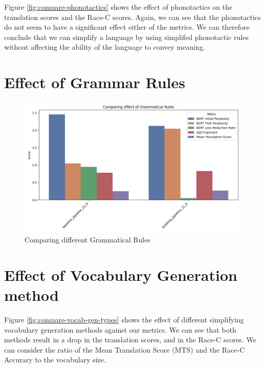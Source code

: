 Figure \ref{fig:compare-phonotactics} shows the effect of phonotactics on the translation scores and the Race-C scores. Again, we can see that
the phonotactics do not seem to have a significant effect either of the metrics. We can therefore conclude that we can simplify a language by 
using simplifed phonotactic rules without affecting the ability of the language to convey meaning.

\section{Effect of Grammar Rules}

\begin{figure}[H]  
    \centering
    \includegraphics[width=0.7\linewidth]{figures/results/1_effect_of_grammar.png}
    \caption{Comparing different Grammatical Rules}
    \label{fig:compare-grammar}
\end{figure}



\section{Effect of Vocabulary Generation method}

Figure \ref{fig:compare-vocab-gen-types} shows the effect of different simplifying vocabulary generation methods against our metrics.
We can see that both methods result in a drop in the translation scores, and in the Race-C scores. We can consider the ratio of the Mean Translation Score (MTS) and 
the Race-C Accurary to the vocabulary size.

